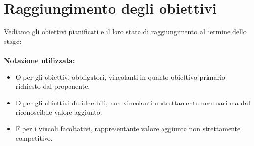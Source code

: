 \section{Raggiungimento degli obiettivi}
Vediamo gli obiettivi pianificati e il loro stato di raggiungimento al termine dello stage: 
\\\\
\textbf{Notazione utilizzata:}
\\
\begin{itemize}
    \item O per gli obiettivi obbligatori, vincolanti in quanto obiettivo primario richiesto dal proponente.
    \item D per gli obiettivi desiderabili, non vincolanti o strettamente necessari ma dal riconoscibile valore aggiunto.
    \item F per i vincoli facoltativi, rappresentante valore aggiunto non strettamente competitivo.
\end{itemize}
\leavevmode\newline
